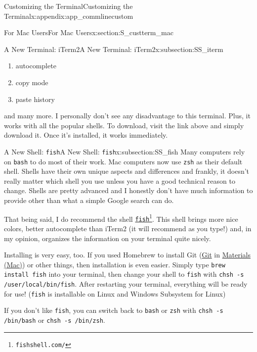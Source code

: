 \documentclass[oneside,10pt,]{book}
\newcommand{\mono}[1]{\texttt{#1}}
\begin{document}
\begin{appendixptx}{Customizing the Terminal}{}{Customizing the Terminal}{}{}{x:appendix:app_commlinecustom}
\begin{sectionptx}{For Mac Users}{}{For Mac Users}{}{}{x:section:S_custterm_mac}
\begin{subsectionptx}{A New Terminal: iTerm2}{}{A New Terminal: iTerm2}{}{}{x:subsection:SS_iterm}
\begin{enumerate}
\item{}autocomplete%
\item{}copy mode%
\item{}paste history%
\end{enumerate}
and many more. I personally don't see any disadvantage to this terminal. Plus, it works with all the popular shells. To download, visit the link above and simply download it. Once it's installed, it works immediately.%
\end{subsectionptx}
%
%
\typeout{************************************************}
\typeout{Subsection A.1.2 A New Shell: \mono{fish}}
\typeout{************************************************}
%
\begin{subsectionptx}{A New Shell: \mono{fish}}{}{A New Shell: \mono{fish}}{}{}{x:subsection:SS_fish}
%
%
Many computers rely on \mono{bash} to do most of their work. Mac computers now use \mono{zsh} as their default shell. Shells have their own unique aspects and differences and frankly, it doesn't really matter which shell you use unless you have a good technical reason to change. Shells are pretty advanced and I honestly don't have much information to provide other than what a simple Google search can do.%
\par
That being said, I do recommend the shell \href{https://fishshell.com/}{\mono{fish}}\footnote{\nolinkurl{fishshell.com/}\label{g:fn:idm479229288}}. This shell brings more nice colors, better autocomplete than iTerm2 (it will recommend as you type!) and, in my opinion, organizes the information on your terminal quite nicely.%
\par
Installing is very easy, too. If you used Homebrew to install Git (\hyperlink{x:paragraphs:install-git-mac}{Git} in \hyperref[x:preface:materials-mac]{Materials (Mac)}) or other things, then installation is even easier. Simply type \mono{brew install fish} into your terminal, then change your shell to \mono{fish} with \mono{chsh -s /user/local/bin/fish}. After restarting your terminal, everything will be ready for use! (\mono{fish} is installable on Linux and Windows Subsystem for Linux)%
\par
If you don't like \mono{fish}, you can switch back to \mono{bash} or \mono{zsh} with \mono{chsh -s /bin/bash} or \mono{chsh -s /bin/zsh}.%
\end{subsectionptx}
\end{sectionptx}
%
%
\typeout{************************************************}

\end{appendixptx}
\end{document}
